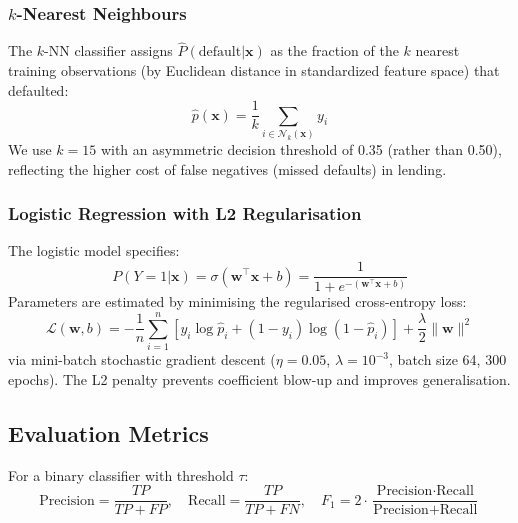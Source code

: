 \documentclass[12pt,a4paper]{article}
\begin{document}
\subsubsection{$k$-Nearest Neighbours}

The $k$-NN classifier assigns $\hat{P}(\text{default}|\mathbf{x})$ as the
fraction of the $k$ nearest training observations (by Euclidean distance in
standardized feature space) that defaulted:
\begin{equation}
  \hat{p}(\mathbf{x}) = \frac{1}{k}\sum_{i \in \mathcal{N}_k(\mathbf{x})} y_i
  \label{eq:knn}
\end{equation}
We use $k=15$ with an asymmetric decision threshold of 0.35 (rather than 0.50),
reflecting the higher cost of false negatives (missed defaults) in lending.

\subsubsection{Logistic Regression with L2 Regularisation}

The logistic model specifies:
\begin{equation}
  P(Y=1|\mathbf{x}) = \sigma(\mathbf{w}^\top\mathbf{x} + b)
  = \frac{1}{1 + e^{-(\mathbf{w}^\top\mathbf{x} + b)}}
  \label{eq:logistic}
\end{equation}
Parameters are estimated by minimising the regularised cross-entropy loss:
\begin{equation}
  \mathcal{L}(\mathbf{w}, b) = -\frac{1}{n}\sum_{i=1}^{n}
  \left[y_i\log\hat{p}_i + (1-y_i)\log(1-\hat{p}_i)\right]
  + \frac{\lambda}{2}\|\mathbf{w}\|^2
  \label{eq:logloss}
\end{equation}
via mini-batch stochastic gradient descent ($\eta=0.05$, $\lambda=10^{-3}$,
batch size 64, 300 epochs). The L2 penalty prevents coefficient blow-up and
improves generalisation.

\subsection{Evaluation Metrics}

For a binary classifier with threshold $\tau$:
\begin{equation}
  \text{Precision} = \frac{TP}{TP+FP}, \quad
  \text{Recall}    = \frac{TP}{TP+FN}, \quad
  F_1              = 2\cdot\frac{\text{Precision}\cdot\text{Recall}}{\text{Precision}+\text{Recall}}
  \label{eq:metrics}
\end{equation}
\end{document}

